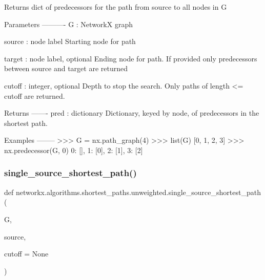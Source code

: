 \begin{DoxyVerb}Returns dict of predecessors for the path from source to all nodes in G


Parameters
----------
G : NetworkX graph

source : node label
   Starting node for path

target : node label, optional
   Ending node for path. If provided only predecessors between
   source and target are returned

cutoff : integer, optional
    Depth to stop the search. Only paths of length <= cutoff are returned.


Returns
-------
pred : dictionary
    Dictionary, keyed by node, of predecessors in the shortest path.

Examples
--------
>>> G = nx.path_graph(4)
>>> list(G)
[0, 1, 2, 3]
>>> nx.predecessor(G, 0)
{0: [], 1: [0], 2: [1], 3: [2]}\end{DoxyVerb}
 \mbox{\label{namespacenetworkx_1_1algorithms_1_1shortest__paths_1_1unweighted_a38f1b06d8b948cf3dc4d6e1a22e81211}} 
\subsubsection{\texorpdfstring{single\+\_\+source\+\_\+shortest\+\_\+path()}{single\_source\_shortest\_path()}}
{\footnotesize\ttfamily def networkx.\+algorithms.\+shortest\+\_\+paths.\+unweighted.\+single\+\_\+source\+\_\+shortest\+\_\+path (\begin{DoxyParamCaption}\item[{}]{G,  }\item[{}]{source,  }\item[{}]{cutoff = {\ttfamily None} }\end{DoxyParamCaption})}

